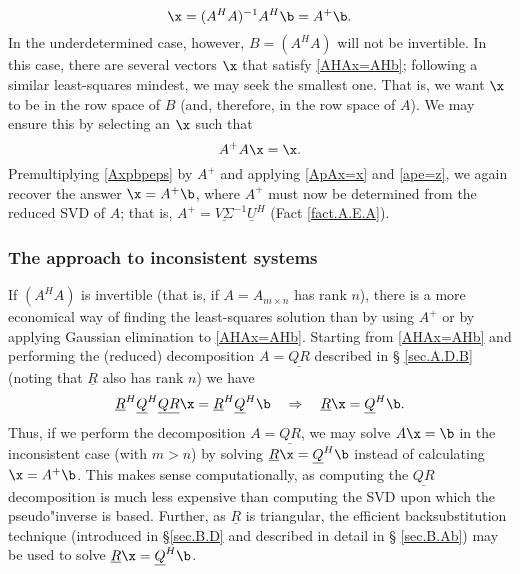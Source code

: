\begin{equation}
\x=(A^{H} A)^{-1}A^{H}\b=A^{+}\b.
\label{Aplussol}
\end{equation}
In the underdetermined case, however, $B=(A^{H} A)$ will not be
invertible.  In this case, there are several vectors $\x$ that satisfy
\eqref{AHAx=AHb}; following a similar least-squares mindest, we may
seek the smallest one.  That is, we want $\x$ to be in the row space
of $B$ (and, therefore, in the row space of $A$).  We may ensure this
by selecting an $\x$ such that
\begin{equation}
A^{+} A\x=\x.
\label{ApAx=x}
\end{equation}
Premultiplying \eqref{Axpbpeps} by $A^{+}$ and applying \eqref{ApAx=x}
and \eqref{ape=z}, we again recover the answer $\x=A^{+}\b$, where
$A^{+}$ must now be determined from the reduced SVD of $A$; that is, $A^{+}=\underline{V \Sigma}^{-1} \underline{U}^{H}$ (Fact \ref{fact.A.E.A}).

\subsubsection{The  approach to inconsistent systems}\label{sec:QRinconsys}

If $(A^{H} A)$ is invertible (that is, if $A=A_{m\times n}$ has rank
$n$), there is a more economical way of finding the least-squares
solution than by using $A^{+}$ or by applying Gaussian elimination to
\eqref{AHAx=AHb}.  Starting from \eqref{AHAx=AHb} and performing the
(reduced) decomposition $A=\underline{QR}$ described in \S
\ref{sec.A.D.B} (noting that $\underline{R}$ also has rank $n$) we
have
\begin{equation*}
    \underline{R}^{H} \underline{Q}^{H} \underline{Q R} \x = \underline{R}^{H} \underline{Q}^{H} \b \quad \Rightarrow \quad
    \underline{R}\x=\underline{Q}^{H} \b.
\end{equation*}
Thus, if we perform the decomposition $A=\underline{QR}$, we may solve
$A\x=\b$ in the inconsistent case (with $m>n$) by solving
$\underline{R}\x=\underline{Q}^{H} \b$ instead of calculating
$\x=A^{+}\b$.  This makes sense computationally, as computing
the $\underline{QR}$ decomposition is much less expensive than
computing the SVD upon which the pseudo"inverse is based.  Further, as
$\underline{R}$ is triangular, the efficient backsubstitution
technique (introduced in \S \ref{sec.B.D} and described in detail in \S
\ref{sec.B.Ab}) may be used to solve $\underline{R}\x=\underline{Q}^{H}
\b$.

